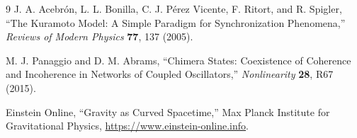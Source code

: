 \documentclass[11pt]{article}
\begin{document}
\begin{thebibliography}{9}
J. A. Acebr\'{o}n, L. L. Bonilla, C. J. P\'{e}rez Vicente, F. Ritort, and R. Spigler,
``The Kuramoto Model: A Simple Paradigm for Synchronization Phenomena,''
\textit{Reviews of Modern Physics} \textbf{77}, 137 (2005).

M. J. Panaggio and D. M. Abrams, ``Chimera States: Coexistence of Coherence and Incoherence in Networks of Coupled Oscillators,''
\textit{Nonlinearity} \textbf{28}, R67 (2015).

Einstein Online, ``Gravity as Curved Spacetime,''
Max Planck Institute for Gravitational Physics, \url{https://www.einstein-online.info}.

\end{thebibliography}
\end{document}
